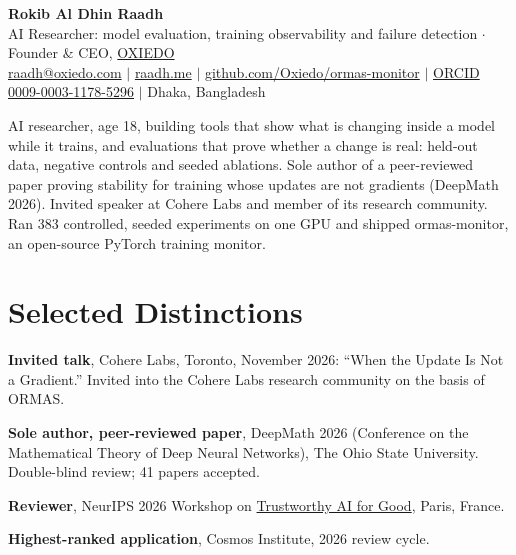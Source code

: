 \documentclass[10pt,a4paper]{article}
\begin{document}
\RaggedRight
\color{body}

\begin{center}
  {\LARGE\bfseries\color{heading} Rokib Al Dhin Raadh}\\[3pt]
  {\small AI Researcher: model evaluation, training observability and failure detection \enspace$\cdot$\enspace Founder \& CEO, \href{https://oxiedo.com}{OXIEDO}}\\[3pt]
  {\footnotesize
    \href{mailto:raadh@oxiedo.com}{raadh@oxiedo.com}
    \enspace$|$\enspace
    \href{https://www.raadh.me}{raadh.me}
    \enspace$|$\enspace
    \href{https://github.com/Oxiedo/ormas-monitor}{github.com/Oxiedo/ormas-monitor}
    \enspace$|$\enspace
    \href{https://orcid.org/0009-0003-1178-5296}{ORCID 0009-0003-1178-5296}
    \enspace$|$\enspace
    {\color{muted}Dhaka, Bangladesh}
  }
\end{center}
\vspace{1pt}

{\small\noindent AI researcher, age 18, building tools that show what is changing inside a model while it trains, and evaluations that prove whether a change is real: held-out data, negative controls and seeded ablations. Sole author of a peer-reviewed paper proving stability for training whose updates are not gradients (DeepMath 2026). Invited speaker at Cohere Labs and member of its research community. Ran 383 controlled, seeded experiments on one GPU and shipped ormas-monitor, an open-source PyTorch training monitor.\par}

\section*{Selected Distinctions}
\begin{bullets}
  \item \textbf{Invited talk}, Cohere Labs, Toronto, November 2026: ``When the Update Is Not a Gradient.'' Invited into the Cohere Labs research community on the basis of ORMAS.
  \item \textbf{Sole author, peer-reviewed paper}, DeepMath 2026 (Conference on the Mathematical Theory of Deep Neural Networks), The Ohio State University. Double-blind review; 41 papers accepted.
  \item \textbf{Reviewer}, NeurIPS 2026 Workshop on \href{https://trustworthy-ai-for-good.github.io/}{Trustworthy AI for Good}, Paris, France.
  \item \textbf{Highest-ranked application}, Cosmos Institute, 2026 review cycle.
\end{bullets}
\end{document}
